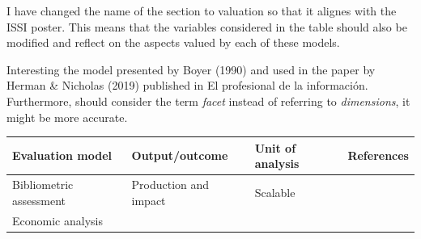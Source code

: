 \documentclass[]{elsarticle} %
\begin{document}
I have changed the name of the section to valuation so that it alignes
with the ISSI poster. This means that the variables considered in the
table should also be modified and reflect on the aspects valued by each
of these models.

Interesting the model presented by Boyer (1990) and used in the paper by
Herman \& Nicholas (2019) published in El profesional de la información.
Furthermore, should consider the term \emph{facet} instead of referring
to \emph{dimensions}, it might be more accurate.

\begin{longtable}[]{@{}llll@{}}
\toprule
\begin{minipage}[b]{0.24\columnwidth}\raggedright
Evaluation model\strut
\end{minipage} & \begin{minipage}[b]{0.23\columnwidth}\raggedright
Output/outcome\strut
\end{minipage} & \begin{minipage}[b]{0.25\columnwidth}\raggedright
Unit of analysis\strut
\end{minipage} & \begin{minipage}[b]{0.16\columnwidth}\raggedright
References\strut
\end{minipage}\tabularnewline
\midrule
\endhead
\begin{minipage}[t]{0.24\columnwidth}\raggedright
Bibliometric assessment\strut
\end{minipage} & \begin{minipage}[t]{0.23\columnwidth}\raggedright
Production and impact\strut
\end{minipage} & \begin{minipage}[t]{0.25\columnwidth}\raggedright
Scalable\strut
\end{minipage} & \begin{minipage}[t]{0.16\columnwidth}\raggedright
\strut
\end{minipage}\tabularnewline
\begin{minipage}[t]{0.24\columnwidth}\raggedright
Economic analysis\strut
\end{minipage} & \begin{minipage}[t]{0.23\columnwidth}\raggedright
\strut
\end{minipage} & \begin{minipage}[t]{0.25\columnwidth}\raggedright
\strut
\end{minipage} & \begin{minipage}[t]{0.16\columnwidth}\raggedright

\end{minipage}
\end{longtable}
\end{document}
